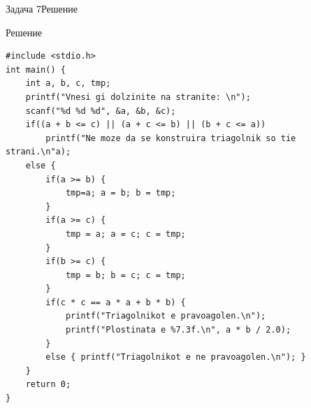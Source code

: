 \begin{frame}[fragile,shrink=30]{Задача 7}{Решение}
    \begin{exampleblock}{Решение}
\begin{lstlisting}
#include <stdio.h> 
int main() {
    int a, b, c, tmp;
    printf("Vnesi gi dolzinite na stranite: \n");
    scanf("%d %d %d", &a, &b, &c);
    if((a + b <= c) || (a + c <= b) || (b + c <= a))
        printf("Ne moze da se konstruira triagolnik so tie strani.\n"a);
    else {
        if(a >= b) {
            tmp=a; a = b; b = tmp;
        }
        if(a >= c) {
            tmp = a; a = c; c = tmp;
        }
        if(b >= c) {
            tmp = b; b = c; c = tmp;
        }
        if(c * c == a * a + b * b) {
            printf("Triagolnikot e pravoagolen.\n");
            printf("Plostinata e %7.3f.\n", a * b / 2.0);
        }
        else { printf("Triagolnikot e ne pravoagolen.\n"); }
    }
    return 0;
}
        \end{lstlisting}
    \end{exampleblock}
\end{frame}
